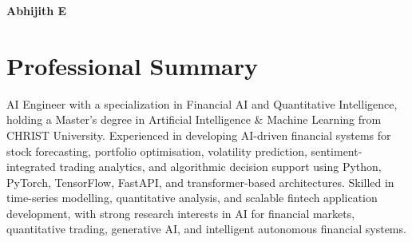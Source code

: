 \documentclass[a4paper,10.5pt]{article}
\begin{document}

\begin{center}

{\Huge\bfseries\color{textblack} Abhijith E}

\vspace{4pt}

\small
{}

\end{center}

\vspace{2pt}


\section{Professional Summary}

\small{
AI Engineer with a specialization in Financial AI and Quantitative Intelligence, holding a Master’s degree in Artificial Intelligence \& Machine Learning from CHRIST University. Experienced in developing AI-driven financial systems for stock forecasting, portfolio optimisation, volatility prediction, sentiment-integrated trading analytics, and algorithmic decision support using Python, PyTorch, TensorFlow, FastAPI, and transformer-based architectures. Skilled in time-series modelling, quantitative analysis, and scalable fintech application development, with strong research interests in AI for financial markets, quantitative trading, generative AI, and intelligent autonomous financial systems.
}
\end{document}
